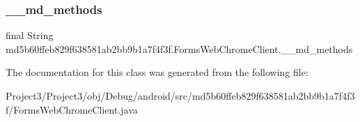 \subsubsection{\texorpdfstring{\+\_\+\+\_\+md\+\_\+methods}{\_\_md\_methods}}
{\footnotesize\ttfamily final String md5b60ffeb829f638581ab2bb9b1a7f4f3f.\+Forms\+Web\+Chrome\+Client.\+\_\+\+\_\+md\+\_\+methods\hspace{0.3cm}{\ttfamily [static]}}



The documentation for this class was generated from the following file\+:\begin{DoxyCompactItemize}
\item 
Project3/\+Project3/obj/\+Debug/android/src/md5b60ffeb829f638581ab2bb9b1a7f4f3f/Forms\+Web\+Chrome\+Client.\+java\end{DoxyCompactItemize}
